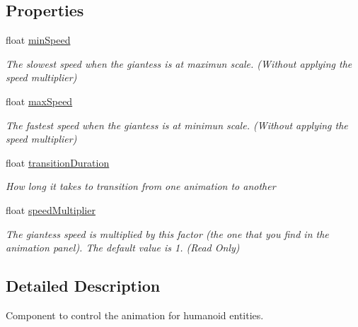 \subsection*{Properties}
\begin{DoxyCompactItemize}
\item 
float \mbox{\hyperlink{class_lua_1_1_animation_a7dee7e3d2e6bdffed96f20822e4bb307}{min\+Speed}}
\begin{DoxyCompactList}\small\item\em The slowest speed when the giantess is at maximun scale. (Without applying the speed multiplier) \end{DoxyCompactList}\item 
float \mbox{\hyperlink{class_lua_1_1_animation_a49aa08ef58b67f1af48526781176fce3}{max\+Speed}}
\begin{DoxyCompactList}\small\item\em The fastest speed when the giantess is at minimun scale. (Without applying the speed multiplier) \end{DoxyCompactList}\item 
float \mbox{\hyperlink{class_lua_1_1_animation_ad1f57da869e710f55a79e82ceb579cc0}{transition\+Duration}}
\begin{DoxyCompactList}\small\item\em How long it takes to transition from one animation to another \end{DoxyCompactList}\item 
float \mbox{\hyperlink{class_lua_1_1_animation_a4418e6d09f625ad76932922c568bf987}{speed\+Multiplier}}
\begin{DoxyCompactList}\small\item\em The giantess speed is multiplied by this factor (the one that you find in the animation panel). The default value is 1. (Read Only) \end{DoxyCompactList}\end{DoxyCompactItemize}


\subsection{Detailed Description}
Component to control the animation for humanoid entities. 



